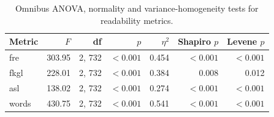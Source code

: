 \begin{table}[H]
\caption{Omnibus ANOVA, normality and variance-homogeneity tests for readability metrics.}
\label{tab:readability:tukey}
\centering
\begin{tabular}{lrrrrrr}
\toprule
Metric & $F$ & df & $p$ & $\eta^2$ & Shapiro $p$ & Levene $p$ \\
\midrule
fre & 303.95 & 2, 732 & $<0.001$ & 0.454 & $<0.001$ & $<0.001$ \\
fkgl & 228.01 & 2, 732 & $<0.001$ & 0.384 & 0.008 & 0.012 \\
asl & 138.02 & 2, 732 & $<0.001$ & 0.274 & $<0.001$ & $<0.001$ \\
words & 430.75 & 2, 732 & $<0.001$ & 0.541 & $<0.001$ & $<0.001$ \\
\bottomrule
\end{tabular}
\end{table}
